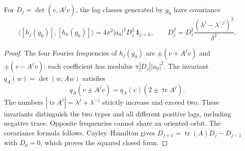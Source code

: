 \begin{lemma}\label{lem:single-lag-orth}
For $D_j=\det(v,A^jv)$, the lag classes generated by $g_0$ have covariance
\[
 \langle[h_j(g_0)],[h_k(g_0)]\rangle
       =4\pi^2|a_0|^4D_j^2\,\mathbf1_{j=k},\qquad
 D_j^2=D_1^2\frac{(\lambda^j-\lambda^{-j})^2}{\delta^2}.
\]
\end{lemma}
\begin{proof}
The four Fourier frequencies of $h_j(g_0)$ are
$\pm(v+A^jv)$ and $\pm(v-A^jv)$; each coefficient has modulus
$\pi|D_j||a_0|^2$. The invariant $q_A(w)=\det(w,Aw)$ satisfies
\[
 q_A(v\pm A^jv)=q_A(v)(2\pm\operatorname{tr}A^j).
\]
The numbers $|\operatorname{tr}A^j|=\lambda^j+\lambda^{-j}$ strictly
increase and exceed two. These invariants distinguish the two types and all
different positive lags, including negative trace. Opposite frequencies
cannot share an oriented orbit. The covariance formula follows.
Cayley--Hamilton gives $D_{j+1}=\operatorname{tr}(A)D_j-D_{j-1}$ with
$D_0=0$, which proves the squared closed form.
\end{proof}

